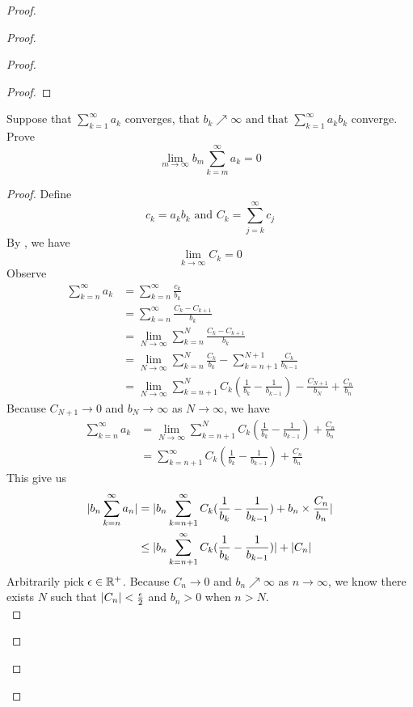 \documentclass{report}
\begin{document}
\begin{proof}
\begin{proof}
\begin{proof}
\begin{proof}
\end{proof}
\begin{question}{}{}
Suppose that $\sum_{k=1}^{\infty} a_k $ converges, that $b_k \nearrow \infty \text{ and that }\sum_{k=1}^{\infty} a_k b_k $
converge. Prove
\begin{equation}
\lim_{m\to\infty}b_m\sum_{k=m}^\infty a_k=0
\end{equation}
\end{question}
\begin{proof}
Define
\begin{equation}
c_k=a_kb_k\text{ and }C_k=\sum_{j=k}^\infty c_j
\end{equation}
By , we have
\begin{equation}
\lim_{k\to\infty}C_k=0
\end{equation}
Observe
\begin{align}
  \sum_{k=n}^\infty a_k&=\sum_{k= n}^\infty \frac{c_k}{b_k}\\
  &=\sum_{k=n}^\infty \frac{C_k-C_{k+1}}{b_k}\\
  &=\lim_{N\to\infty}\sum^N_{k=n} \frac{C_k-C_{k+1}}{b_k}\\
  &=\lim_{N\to\infty}\sum_{k=n}^N \frac{C_k}{b_k}-\sum_{k=n+1}^{N+1}\frac{C_k}{b_{k-1}}\\
  &=\lim_{N\to\infty} \sum_{k=n+1}^{N} C_k(\frac{1}{b_k}-\frac{1}{b_{k-1}})-\frac{C_{N+1}}{b_N}+\frac{C_n}{b_n}
\end{align}
Because $C_{N+1}\to 0$ and $b_N\to \infty$ as $N\to\infty$, we have
\begin{align}
\sum_{k=n}^\infty a_k&=\lim_{N\to\infty}\sum_{k=n+1}^N C_k(\frac{1}{b_k}-\frac{1}{b_{k-1}})+\frac{C_n}{b_n}\\
&=\sum_{k=n+1}^\infty C_k(\frac{1}{b_k}-\frac{1}{b_{k-1}})+\frac{C_n}{b_n}
\end{align}
This give us
\begin{align}
|b_n\sum_{k=n}^\infty a_n|&=|b_n \sum_{k=n+1}^\infty C_k(\frac{1}{b_k}-\frac{1}{b_{k-1}})+b_n\times \frac{C_n}{b_n}|\\
&\leq |b_n\sum_{k=n+1}^\infty C_k (\frac{1}{b_k}-\frac{1}{b_{k-1}})|+|C_n|
\end{align}
Arbitrarily pick $\epsilon \in\mathbb{R}^+$. Because $C_n\to 0$ and $b_n\nearrow \infty$ as $n\to\infty$, we know there exists $N$ such that  $|C_n|<\frac{\epsilon}{2}$  and $b_n>0$ when $n>N$.\\


\end{proof}
\end{proof}
\end{proof}
\end{proof}
\end{document}
